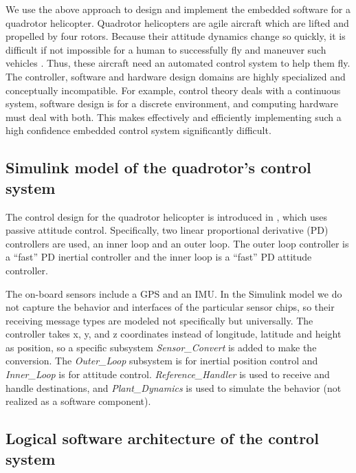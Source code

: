 \documentclass[10pt, conference, compsocconf]{IEEEtran}
\begin{document}
We use the above approach to design and implement the embedded software for a quadrotor helicopter. Quadrotor helicopters are agile aircraft which are lifted and propelled by four rotors. Because their attitude dynamics change so quickly, it is difficult if not impossible for a human to successfully fly and maneuver such vehicles \cite{quad:passcontrol}. Thus, these aircraft need an automated control system to help them fly. The controller, software and hardware design domains are highly specialized and conceptually incompatible. For example, control theory deals with a continuous system, software design is for a discrete environment, and computing hardware must deal with both. This makes effectively and efficiently implementing such a high confidence embedded control system significantly difficult.

\subsection{Simulink model of the quadrotor's control system}

The control design for the quadrotor helicopter is introduced in \cite{quad:passcontrol}, which uses passive attitude control. Specifically, two linear proportional derivative (PD) controllers are used, an inner loop and an outer loop. The outer loop controller is a ``fast'' PD inertial controller and the inner loop is a ``fast'' PD attitude controller.

The on-board sensors include a GPS and an IMU. In the Simulink model we do not capture the behavior and interfaces of the particular sensor chips, so their receiving message types are modeled not specifically but universally. The controller takes x, y, and z coordinates instead of longitude, latitude and height as position, so a specific subsystem \emph{Sensor\_Convert} is added to make the conversion. The \emph{Outer\_Loop} subsystem is for inertial position control and \emph{Inner\_Loop} is for attitude control. \emph{Reference\_Handler} is used to receive and handle destinations, and \emph{Plant\_Dynamics} is used to simulate the behavior (not realized as a software component).

\subsection{Logical software architecture of the control system}
\end{document}
